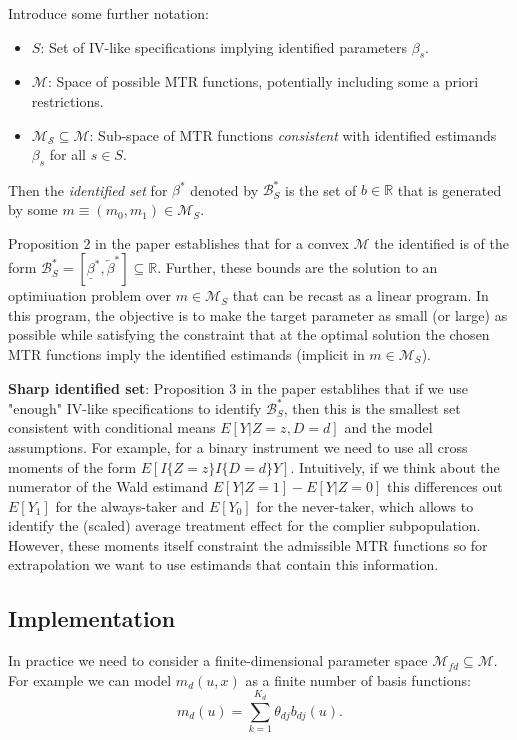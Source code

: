 \documentclass[11pt, a4paper, leqno]{article}
\begin{document}
Introduce some further notation:
\begin{itemize}
    \item $S$: Set of IV-like specifications implying identified parameters $\beta_s$.
    \item $\mathcal{M}$: Space of possible MTR functions, potentially including some a priori restrictions.
    \item $\mathcal{M_S}\subseteq \mathcal{M}$: Sub-space of MTR functions \textit{consistent} with identified estimands $\beta_s$ for all $s\in S$.
\end{itemize}

Then the \textit{identified set} for $\beta^*$ denoted by $\mathcal{B}_S^*$ is the set of $b\in\mathbb{R}$ that is generated by some $m\equiv(m_0, m_1)\in \mathcal{M}_S$.

Proposition 2 in the paper establishes that for a convex $\mathcal{M}$ the identified is of the form $\mathcal{B}^*_S = [\underline{\beta}^*, \overleftarrow{\beta}^*]\subseteq \mathbb{R}$.
Further, these bounds are the solution to an optimiuation problem over $m\in\mathcal{M}_S$ that can be recast as a linear program.
In this program, the objective is to make the target parameter as small (or large) as possible while satisfying the constraint that at the optimal solution the chosen MTR functions imply the identified estimands (implicit in $m\in\mathcal{M}_S$).

\textbf{Sharp identified set}: Proposition 3 in the paper establihes that if we use "enough" IV-like specifications to identify $\mathcal{B}^*_S$, then this is the smallest set consistent with conditional means $E[Y|Z=z, D=d]$ and the model assumptions.
For example, for a binary instrument we need to use all cross moments of the form $E[I\{Z=z\}I\{D=d\}Y]$.
Intuitively, if we think about the numerator of the Wald estimand $E[Y|Z=1] - E[Y|Z=0]$ this differences out $E[Y_1]$ for the always-taker and $E[Y_0]$ for the never-taker, which allows to identify the (scaled) average treatment effect for the complier subpopulation.
However, these moments itself constraint the admissible MTR functions so for extrapolation we want to use estimands that contain this information.


\subsection{Implementation}
In practice we need to consider a finite-dimensional parameter space $\mathcal{M}_{fd}\subseteq \mathcal{M}$.
For example we can model $m_d(u,x)$ as a finite number of basis functions:
\begin{equation*}
    m_d(u) = \sum_{k=1}^{K_d}\theta_{dj}b_{dj}(u).
\end{equation*}
\end{document}
